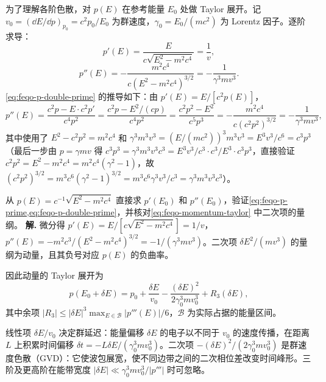 为了理解各阶色散，对 $p(E)$ 在参考能量 $E_0$ 处做 Taylor 展开。记 $v_0 = (\dd E/\dd p)_{p_0} = c^2p_0/E_0$ 为群速度，$\gamma_0 = E_0/(mc^2)$ 为 Lorentz 因子。逐阶求导：
\begin{equation}
p'(E)=\frac{E}{c\sqrt{E^2-m^2c^4}}=\frac{1}{v},
\label{eq:feqo-p-prime}
\end{equation}
\begin{equation}
p''(E)=-\frac{m^2c^4}{c(E^2-m^2c^4)^{3/2}}=-\frac{1}{\gamma^3 m v^3}.
\label{eq:feqo-p-double-prime}
\end{equation}
\cref{eq:feqo-p-double-prime} 的推导如下：由 $p'(E)=E/[c^2 p(E)]$，
\[
p''(E)=\frac{c^2 p - E \cdot c^2 p'}{c^4 p^2}
=\frac{c^2 p - E^2/(cp)}{c^4 p^2}
=\frac{c^2 p^2 - E^2}{c^5 p^3}
=-\frac{m^2c^4}{c(c^2p^2)^{3/2}}
=-\frac{1}{\gamma^3 mv^3},
\]
其中使用了 $E^2 - c^2p^2 = m^2c^4$ 和 $\gamma^3 m^3 v^3 = (E/(mc^2))^3 m^3 v^3 = E^3 v^3/c^6 = c^3 p^3$（最后一步由 $p = \gamma mv$ 得 $c^3p^3 = \gamma^3 m^3 v^3 c^3 = E^3 v^3/c^3 \cdot c^3/E^3 \cdot c^3p^3$，直接验证 $c^2p^2 = E^2 - m^2c^4 = m^2c^4(\gamma^2-1)$，故 $(c^2p^2)^{3/2} = m^3c^6(\gamma^2-1)^{3/2} = m^3c^6\gamma^3 v^3/c^3 = \gamma^3 m^3 v^3 c^3$）。


\par
\begin{workedexample}
从 $p(E)=c^{-1}\sqrt{E^2-m^2c^4}$ 直接求 $p'(E_0)$ 和 $p''(E_0)$，验证\cref{eq:feqo-p-prime,eq:feqo-p-double-prime}，并核对\cref{eq:feqo-momentum-taylor} 中二次项的量纲。
\textbf{解.} 微分得 $p'(E)=E/[c\sqrt{E^2-m^2c^4}]=1/v$，$p''(E)=-m^2c^3/(E^2-m^2c^4)^{3/2}=-1/(\gamma^3mv^3)$。二次项 $\delta E^2/(mv^3)$ 的量纲为动量，且其负号对应 $p(E)$ 的负曲率。
\end{workedexample}
\par
因此动量的 Taylor 展开为
\begin{equation}
p(E_0+\delta E)=p_0+\frac{\delta E}{v_0}
-\frac{(\delta E)^2}{2\gamma_0^3mv_0^3}
+R_3(\delta E),
\label{eq:feqo-momentum-taylor}
\end{equation}
其中余项 $|R_3|\leq |\delta E|^3 \max_{E\in\mathcal{B}}|p'''(E)|/6$，$\mathcal{B}$ 为实际占据的能量区间。

\begin{note}[各项的物理意义]
线性项 $\delta E/v_0$ 决定群延迟：能量偏移 $\delta E$ 的电子以不同于 $v_0$ 的速度传播，在距离 $L$ 上积累时间偏移 $\delta t = -L\delta E/(\gamma_0^3mv_0^3)$。二次项 $-(\delta E)^2/(2\gamma_0^3mv_0^3)$ 是群速度色散（GVD）：它使波包展宽，使不同边带之间的二次相位差改变时间峰形。三阶及更高阶在能带宽度 $|\delta E|\ll \gamma_0^3 mv_0^3/|p'''|$ 时可忽略。

\end{note}

